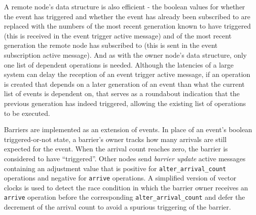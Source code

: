 A remote node's data structure is also efficient - the boolean values for whether the event
has triggered and whether the event has already been subscribed to are replaced with the numbers of the most
recent generation known to have triggered (this is received in the event trigger active message) and of the
most recent generation the remote node has subscribed to (this is sent in the event subscription active
message).  And as with the owner node's data structure, only
one list of dependent operations is needed.  Although the latencies of a large system can delay the
reception of an event trigger active message, if an operation is created that depends on a later generation
of an event than what the current list of events is dependent on, that serves as a roundabout indication that
the previous generation has indeed triggered, allowing the existing list of operations to be executed.

Barriers are implemented as an extension of events.  In place of an event's boolean triggered-or-not state,
a barrier's owner tracks how many arrivals are still expected for the event.  When the arrival count 
reaches zero, the barrier is considered to have ``triggered''.  Other nodes send {\em barrier update}
active messages containing an adjustment value that is positive for {\tt alter\_arrival\_count} operations 
and negative for {\tt arrive} operations.  A simplified version of vector clocks\cite{Fidge1998} is used
to detect the race condition in which the barrier owner receives an {\tt arrive} operation before the
corresponding {\tt alter\_arrival\_count} and defer the decrement of the arrival count to avoid a spurious
triggering of the barrier.


